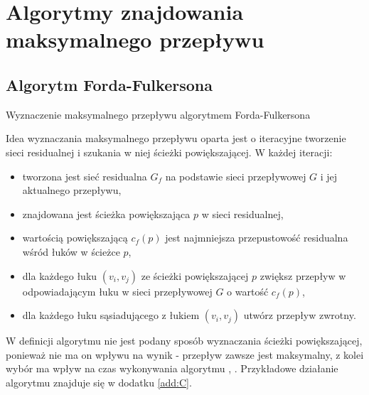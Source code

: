 \section{Algorytmy znajdowania maksymalnego przepływu}\label{sec:analizaAlgorytmy}
\subsection{Algorytm Forda-Fulkersona}\label{ssec:FordFulkersonAnaliza}
\begin{algorithm}[H]
	\caption{Wyznaczenie maksymalnego przepływu algorytmem Forda-Fulkersona}\label{fordFulkersonPseudo}
	\begin{algorithmic}
				\EndFor
			\EndWhile{}
		\EndProcedure
	\end{algorithmic}
\end{algorithm}\noindent
Idea wyznaczania maksymalnego przepływu oparta jest o iteracyjne tworzenie sieci residualnej i szukania w niej ścieżki powiększającej. W każdej iteracji:
\begin{itemize}
	\item tworzona jest sieć residualna $ G_f $ na podstawie sieci przepływowej $ G $ i jej aktualnego przepływu,
	\item znajdowana jest ścieżka powiększająca $ p $ w sieci residualnej,
	\item wartością powiększającą $ c_f(p) $ jest najmniejsza przepustowość residualna wśród łuków w ścieżce $ p $,
	\item dla każdego łuku $ (v_i,v_j) $ ze ścieżki powiększającej $ p $ zwiększ przepływ w odpowiadającym łuku w sieci przepływowej $ G $ o wartość $ c_f(p) $,
	\item dla każdego łuku sąsiadującego z łukiem $ (v_i,v_j) $ utwórz przepływ zwrotny. 
\end{itemize}
W definicji algorytmu nie jest podany sposób wyznaczania ścieżki powiększającej, ponieważ nie ma on wpływu na wynik - przepływ zawsze jest maksymalny, z kolei wybór ma wpływ na czas wykonywania algorytmu \cite{id:ZaawansowaneAlgorytmy}, \cite{id:IntroductionToAlgorithms}. Przykładowe działanie algorytmu znajduje się w dodatku \ref{add:C}.
